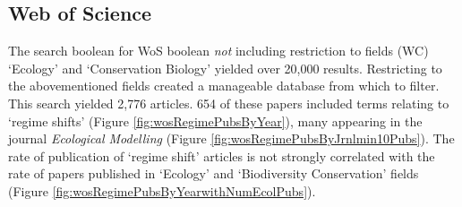 \documentclass[12pt,twoside,openany]{reedthesis}
\newenvironment{Shaded}{\begin{snugshade}}{\end{snugshade}}
\newcommand{\KeywordTok}[1]{\textcolor[rgb]{0.13,0.29,0.53}{\textbf{#1}}}
\newcommand{\DataTypeTok}[1]{\textcolor[rgb]{0.13,0.29,0.53}{#1}}
\newcommand{\DecValTok}[1]{\textcolor[rgb]{0.00,0.00,0.81}{#1}}
\newcommand{\FloatTok}[1]{\textcolor[rgb]{0.00,0.00,0.81}{#1}}
\newcommand{\CharTok}[1]{\textcolor[rgb]{0.31,0.60,0.02}{#1}}
\newcommand{\StringTok}[1]{\textcolor[rgb]{0.31,0.60,0.02}{#1}}
\newcommand{\OperatorTok}[1]{\textcolor[rgb]{0.81,0.36,0.00}{\textbf{#1}}}
\newcommand{\NormalTok}[1]{#1}
\begin{document}
\subsection{Web of Science}\label{web-of-science-1}

The search boolean for WoS boolean \emph{not} including restriction to
fields (WC) `Ecology' and `Conservation Biology' yielded over 20,000
results. Restricting to the abovementioned fields created a manageable
database from which to filter. This search yielded 2,776 articles. 654
of these papers included terms relating to `regime shifts' (Figure
\ref{fig:wosRegimePubsByYear}), many appearing in the journal
\emph{Ecological Modelling} (Figure
\ref{fig:wosRegimePubsByJrnlmin10Pubs}). The rate of publication of
`regime shift' articles is not strongly correlated with the rate of
papers published in `Ecology' and `Biodiversity Conservation' fields
(Figure \ref{fig:wosRegimePubsByYearwithNumEcolPubs}).
\begin{Shaded}
\end{Shaded}
\end{document}
